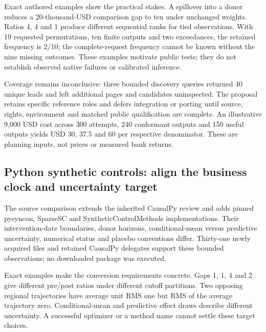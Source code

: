 Exact authored examples show the practical stakes. A spillover into a
donor reduces a 20-thousand-USD comparison gap to ten under unchanged
weights. Ratios 4, 4 and 1 produce different sequential ranks for tied
observations. With 19 requested permutations, ten finite outputs and two
exceedances, the retained frequency is 2/10; the complete-request
frequency cannot be known without the nine missing outcomes. These
examples motivate public tests; they do not establish observed native
failures or calibrated inference. \citep{exec25_synthr_choice}

Coverage remains inconclusive: three bounded discovery queries returned
40 unique leads and left additional pages and candidates uninspected.
The proposal retains specific reference roles and defers integration or
porting until source, rights, environment and matched public
qualification are complete. An illustrative 9,000 USD cost across 300
attempts, 240 conformant outputs and 150 useful outputs yields USD 30,
37.5 and 60 per respective denominator. These are planning inputs, not
prices or measured bank returns. \citep{exec25_synthr_choice}

\hypertarget{python-synthetic-controls-align-the-business-clock-and-uncertainty-target}{%
\subsection{Python synthetic controls: align the business clock and
uncertainty
target}\label{python-synthetic-controls-align-the-business-clock-and-uncertainty-target}}

The source comparison extends the inherited CausalPy review and adds
pinned pysyncon, SparseSC and SyntheticControlMethods implementations.
Their intervention-date boundaries, donor horizons, conditional-mean
versus predictive uncertainty, numerical status and placebo conventions
differ. Thirty-one newly acquired files and retained CausalPy delegates
support these bounded observations; no downloaded package was executed.
\citep{exec25_synthpy_causalpy,exec25_synthpy_pysyncon,exec25_synthpy_sparse,exec25_synthpy_methods}

Exact examples make the conversion requirements concrete. Gaps 1, 1, 4
and 2 give different pre/post ratios under different cutoff partitions.
Two opposing regional trajectories have average unit RMS one but RMS of
the average trajectory zero. Conditional-mean and predictive effect
draws describe different uncertainty. A successful optimizer or a method
name cannot settle these target choices. \citep{exec25_synthpy_choice}

